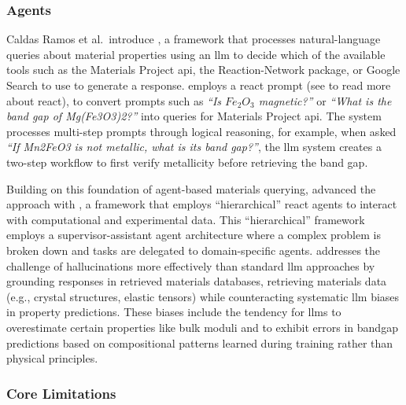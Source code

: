 \subsubsection{Agents}

Caldas Ramos et al.\ introduce , a framework that processes natural-language queries about material properties using an \gls{llm} to decide which of the available tools such as the Materials Project \gls{api}, the Reaction-Network package, or Google Search to use to generate a response. \autocite{Jablonka2023}  employs a \gls{react} prompt (see  to read more about \gls{react}), to convert prompts such as  \textit{\enquote{Is $Fe_2O_3$ magnetic?}} or \textit{\enquote{What is the band gap of Mg(Fe3O3)2?}} into queries for Materials Project \gls{api}. 
The system processes multi-step prompts through logical reasoning, for example, when asked \textit{\enquote{If Mn2FeO3 is not metallic, what is its band gap?}}, the \gls{llm} system creates a two-step workflow to first verify metallicity before retrieving the band gap.

Building on this foundation of agent-based materials querying, \textcite{chiang2024llamp} advanced the approach with , a framework that employs \enquote{hierarchical} \gls{react} agents to interact with computational and experimental data. This \enquote{hierarchical} framework employs a supervisor-assistant agent architecture where a complex problem is broken down and tasks are delegated to domain-specific agents.   addresses the challenge of hallucinations more effectively than standard \gls{llm} approaches by grounding responses in retrieved materials databases, retrieving materials data (e.g., crystal structures, elastic tensors) while counteracting systematic \gls{llm} biases in property predictions. These biases include the tendency for \glspl{llm} to overestimate certain properties like bulk moduli and to exhibit errors in bandgap predictions based on compositional patterns learned during training rather than physical principles.


\subsubsection{Core Limitations}\label{sec:property_core_limits}

